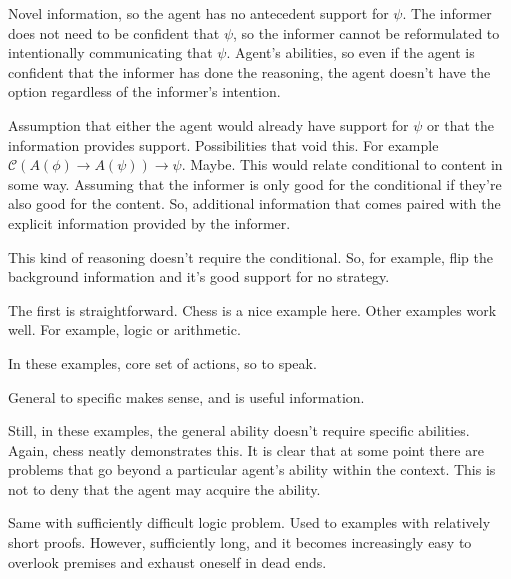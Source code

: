 \documentclass[10pt]{article}
\begin{document}
\begin{note}
  Novel information, so the agent has no antecedent support for \(\psi\).
  The informer does not need to be confident that \(\psi\), so the informer cannot be reformulated to intentionally communicating that \(\psi\).
  Agent's abilities, so even if the agent is confident that the informer has done the reasoning, the agent doesn't have the option regardless of the informer's intention.
\end{note}

\begin{note}
  Assumption that either the agent would already have support for \(\psi\) or that the information provides support.
  Possibilities that void this.
  For example \(\mathcal{C}(A(\phi) \rightarrow A(\psi)) \rightarrow \psi\).
  Maybe.
  This would relate conditional to content in some way.
  Assuming that the informer is only good for the conditional if they're also good for the content.
  So, additional information that comes paired with the explicit information provided by the informer.

  This kind of reasoning doesn't require the conditional.
  So, for example, flip the background information and it's good support for no strategy.
\end{note}

\begin{note}
  The first is straightforward.
  Chess is a nice example here.
  Other examples work well.
  For example, logic or arithmetic.

  In these examples, core set of actions, so to speak.
\end{note}

\begin{note}
  General to specific makes sense, and is useful information.

  Still, in these examples, the general ability doesn't require specific abilities.
  Again, chess neatly demonstrates this.
  It is clear that at some point there are problems that go beyond a particular agent's ability within the context.
  This is not to deny that the agent may acquire the ability.

  Same with sufficiently difficult logic problem.
  Used to examples with relatively short proofs.
  However, sufficiently long, and it becomes increasingly easy to overlook premises and exhaust oneself in dead ends.
\end{note}
\end{document}
